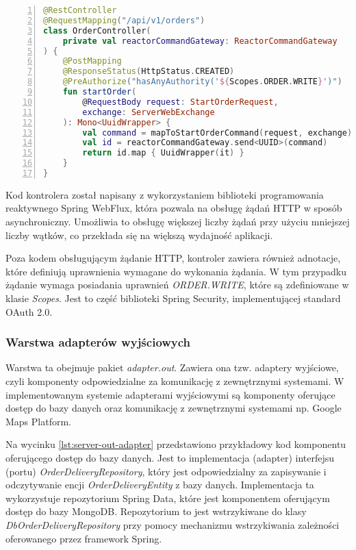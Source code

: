 \begin{lstlisting}[caption={Kod kontrolera REST API obsługującego zapytania dotyczące zamówień},label={lst:server-in-adapter},captionpos=b,language=Kotlin,numbers=left]
@RestController
@RequestMapping("/api/v1/orders")
class OrderController(
    private val reactorCommandGateway: ReactorCommandGateway
) {
    @PostMapping
    @ResponseStatus(HttpStatus.CREATED)
    @PreAuthorize("hasAnyAuthority('${Scopes.ORDER.WRITE}')")
    fun startOrder(
        @RequestBody request: StartOrderRequest,
        exchange: ServerWebExchange
    ): Mono<UuidWrapper> {
        val command = mapToStartOrderCommand(request, exchange)
        val id = reactorCommandGateway.send<UUID>(command)
        return id.map { UuidWrapper(it) }
    }
}
\end{lstlisting}

Kod kontrolera został napisany z wykorzystaniem biblioteki programowania reaktywnego Spring WebFlux, która pozwala na obsługę żądań HTTP w sposób asynchroniczny. Umożliwia to obsługę większej liczby żądań przy użyciu mniejszej liczby wątków, co przekłada się na większą wydajność aplikacji.

Poza kodem obsługującym żądanie HTTP, kontroler zawiera również adnotacje, które definiują uprawnienia wymagane do wykonania żądania. W tym przypadku żądanie wymaga posiadania uprawnień \textit{ORDER.WRITE}, które są zdefiniowane w klasie \textit{Scopes}. Jest to część biblioteki Spring Security, implementującej standard OAuth 2.0.

\subsubsection{Warstwa adapterów wyjściowych} 

Warstwa ta obejmuje pakiet \textit{adapter.out}. Zawiera ona tzw. adaptery wyjściowe, czyli komponenty odpowiedzialne za komunikację z zewnętrznymi systemami. W implementowanym systemie adapterami wyjściowymi są komponenty oferujące dostęp do bazy danych oraz komunikację z zewnętrznymi systemami np. Google Maps Platform.

Na wycinku \ref{lst:server-out-adapter} przedstawiono przykładowy kod komponentu oferującego dostęp do bazy danych. Jest to implementacja (adapter) interfejsu (portu) \textit{OrderDeliveryRepository}, który jest odpowiedzialny za zapisywanie i odczytywanie encji \textit{OrderDeliveryEntity} z bazy danych. Implementacja ta wykorzystuje repozytorium Spring Data, które jest komponentem oferującym dostęp do bazy MongoDB. Repozytorium to jest wstrzykiwane do klasy \textit{DbOrderDeliveryRepository} przy pomocy mechanizmu wstrzykiwania zależności oferowanego przez framework Spring. 

